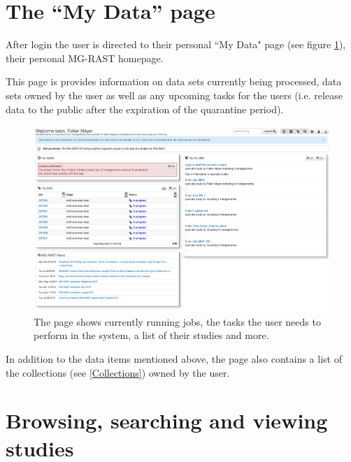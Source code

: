 \documentclass[12pt,fullpage]{report}
\begin{document}
\section{The ``My Data'' page}

After login the user is directed to their personal ``My Data" page (see figure \ref{fig:v4-mydata}), their personal MG-RAST homepage.

This page is provides information on data sets currently being processed, data sets owned by the user as well as any upcoming tasks for the users (i.e. release data to the public after the expiration of the quarantine period).

\begin{figure}[H]
\begin{center}
\includegraphics[width=7in]{Images/v4-my-data.png}
\end{center}
\caption{
The page shows currently running jobs, the tasks the user needs to perform in the system, a list of their studies and more.
}
\label{fig:v4-mydata}
\end{figure}

In addition to the data items mentioned above, the page also contains a list of the collections (see \ref{Collections}) owned by the user.


\section{Browsing, searching and viewing studies}
\end{document}
